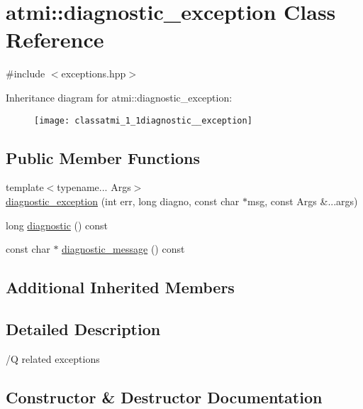 \hypertarget{classatmi_1_1diagnostic__exception}{}\section{atmi\+:\+:diagnostic\+\_\+exception Class Reference}
\label{classatmi_1_1diagnostic__exception}


{\ttfamily \#include $<$exceptions.\+hpp$>$}

Inheritance diagram for atmi\+:\+:diagnostic\+\_\+exception\+:\begin{figure}[H]
\begin{center}
\leavevmode
\texttt{[image: classatmi\_1\_1diagnostic\_\_exception]}
\end{center}
\end{figure}
\subsection*{Public Member Functions}
\begin{DoxyCompactItemize}
\item 
{\footnotesize template$<$typename... Args$>$ }\\\hyperlink{classatmi_1_1diagnostic__exception_acf086c2efbe447d733a02988e56be370}{diagnostic\+\_\+exception} (int err, long diagno, const char $\ast$msg, const Args \&...args)
\item 
long \hyperlink{classatmi_1_1diagnostic__exception_a5602718873c6e8122af75d5adf9d375b}{diagnostic} () const 
\item 
const char $\ast$ \hyperlink{classatmi_1_1diagnostic__exception_a60931362229b54fc6847a3efa5e83ffd}{diagnostic\+\_\+message} () const 
\end{DoxyCompactItemize}
\subsection*{Additional Inherited Members}


\subsection{Detailed Description}
/Q related exceptions 

\subsection{Constructor \& Destructor Documentation}
